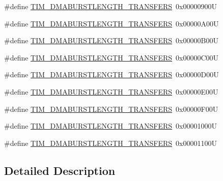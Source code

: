 \begin{DoxyCompactItemize}
\item 
\#define \hyperlink{group___t_i_m___d_m_a___burst___length_ga793a89bb8a0669e274de451985186c53}{T\+I\+M\+\_\+\+D\+M\+A\+B\+U\+R\+S\+T\+L\+E\+N\+G\+T\+H\+\_\+T\+R\+A\+N\+S\+F\+E\+RS}~0x00000900U
\item 
\#define \hyperlink{group___t_i_m___d_m_a___burst___length_ga79ab58b6a3b30c54c0758b381df22cb0}{T\+I\+M\+\_\+\+D\+M\+A\+B\+U\+R\+S\+T\+L\+E\+N\+G\+T\+H\+\_\+T\+R\+A\+N\+S\+F\+E\+RS}~0x00000\+A00U
\item 
\#define \hyperlink{group___t_i_m___d_m_a___burst___length_gaf52962b501b3a76d89df6274ed425947}{T\+I\+M\+\_\+\+D\+M\+A\+B\+U\+R\+S\+T\+L\+E\+N\+G\+T\+H\+\_\+T\+R\+A\+N\+S\+F\+E\+RS}~0x00000\+B00U
\item 
\#define \hyperlink{group___t_i_m___d_m_a___burst___length_ga06a81eba628bea6495d86ebcc6021da0}{T\+I\+M\+\_\+\+D\+M\+A\+B\+U\+R\+S\+T\+L\+E\+N\+G\+T\+H\+\_\+T\+R\+A\+N\+S\+F\+E\+RS}~0x00000\+C00U
\item 
\#define \hyperlink{group___t_i_m___d_m_a___burst___length_ga5f430b76c0aeded0a8d8be779f26ae52}{T\+I\+M\+\_\+\+D\+M\+A\+B\+U\+R\+S\+T\+L\+E\+N\+G\+T\+H\+\_\+T\+R\+A\+N\+S\+F\+E\+RS}~0x00000\+D00U
\item 
\#define \hyperlink{group___t_i_m___d_m_a___burst___length_ga98a4d88c533178bc1b4347e4c5ce815a}{T\+I\+M\+\_\+\+D\+M\+A\+B\+U\+R\+S\+T\+L\+E\+N\+G\+T\+H\+\_\+T\+R\+A\+N\+S\+F\+E\+RS}~0x00000\+E00U
\item 
\#define \hyperlink{group___t_i_m___d_m_a___burst___length_gaf4b2a1fe12c52272544c21e17de1ed90}{T\+I\+M\+\_\+\+D\+M\+A\+B\+U\+R\+S\+T\+L\+E\+N\+G\+T\+H\+\_\+T\+R\+A\+N\+S\+F\+E\+RS}~0x00000\+F00U
\item 
\#define \hyperlink{group___t_i_m___d_m_a___burst___length_gad31c1fca7ed436a53efc4f290144584d}{T\+I\+M\+\_\+\+D\+M\+A\+B\+U\+R\+S\+T\+L\+E\+N\+G\+T\+H\+\_\+T\+R\+A\+N\+S\+F\+E\+RS}~0x00001000U
\item 
\#define \hyperlink{group___t_i_m___d_m_a___burst___length_gabb6f72b02ee1c8855de241cb0713e2ca}{T\+I\+M\+\_\+\+D\+M\+A\+B\+U\+R\+S\+T\+L\+E\+N\+G\+T\+H\+\_\+T\+R\+A\+N\+S\+F\+E\+RS}~0x00001100U
\end{DoxyCompactItemize}


\subsection{Detailed Description}


